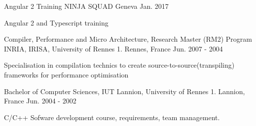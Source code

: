 

\begin{cventries}
\cventry
{Angular 2 Training} %
{NINJA SQUAD} %
{Geneva} %
{Jan. 2017} %
{
	\begin{cvitems} %
		\item {Angular 2 and Typescript training}
	\end{cvitems}
}
  \cventry
    {Compiler, Performance and Micro Architecture, Research Master (RM2) Program} %
    {INRIA, IRISA, University of Rennes 1. } %
    {Rennes, France} %
    {Jun. 2007 - 2004} %
    {
      \begin{cvitems} %
        \item {Specialisation in compilation technics to create source-to-source(transpiling) frameworks for performance optimisation  }
      \end{cvitems}
    }
\cventry
{Bachelor of Computer Sciences, } %
{IUT Lannion, University of Rennes 1. } %
{Lannion, France} %
{Jun. 2004 - 2002} %
{
	\begin{cvitems} %
			\item { C/C++ Sofware development course, requirements, team management. }
	\end{cvitems}
}

\end{cventries}
